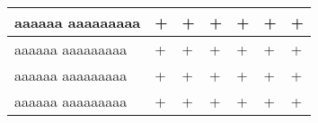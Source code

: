 \documentclass[12pt]{article}
\begin{document}
\begin{longtable}{|m{}|R{0.08\textwidth}|R{0.08\textwidth}|R{0.08\textwidth}|R{0.08\textwidth}|R{0.08\textwidth}|R{0.08\textwidth}|}
    aaaaaa \newline aaaaaaaaa & + & + & + & + & + & + \\ \hline
    aaaaaa \newline aaaaaaaaa & + & + & + & + & + & + \\ \hline
    aaaaaa \newline aaaaaaaaa & + & + & + & + & + & + \\ \hline
    aaaaaa \newline aaaaaaaaa & + & + & + & + & + & + \\ \hline
   \end{longtable}
\end{document}
